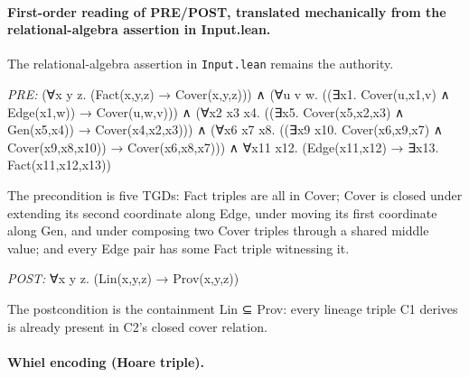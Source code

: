 \documentclass[10pt]{article}
\begin{document}
\paragraph{First-order reading of PRE/POST, translated mechanically from the relational-algebra assertion in Input.lean.} The relational-algebra assertion in \texttt{Input.lean} remains the authority.

\textit{PRE:} (∀x y z. (Fact(x,y,z) → Cover(x,y,z))) ∧ (∀u v w. ((∃x1. Cover(u,x1,v) ∧ Edge(x1,w)) → Cover(u,w,v))) ∧ (∀x2 x3 x4. ((∃x5. Cover(x5,x2,x3) ∧ Gen(x5,x4)) → Cover(x4,x2,x3))) ∧ (∀x6 x7 x8. ((∃x9 x10. Cover(x6,x9,x7) ∧ Cover(x9,x8,x10)) → Cover(x6,x8,x7))) ∧ ∀x11 x12. (Edge(x11,x12) → ∃x13. Fact(x11,x12,x13))\par The precondition is five TGDs: Fact triples are all in Cover; Cover is closed under extending its second coordinate along Edge, under moving its first coordinate along Gen, and under composing two Cover triples through a shared middle value; and every Edge pair has some Fact triple witnessing it.

\textit{POST:} ∀x y z. (Lin(x,y,z) → Prov(x,y,z))\par The postcondition is the containment Lin ⊆ Prov: every lineage triple C1 derives is already present in C2's closed cover relation.

\paragraph{Whiel encoding (Hoare triple).}
\end{document}
